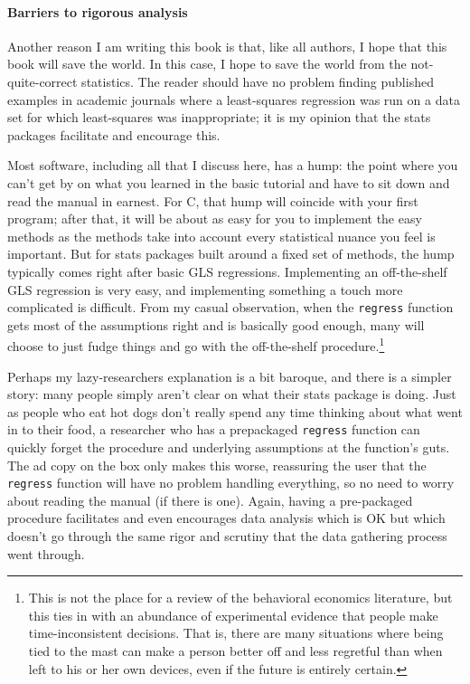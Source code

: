 \paragraph{Barriers to rigorous analysis}
Another reason I am writing this book is that, like all authors, I hope
that this book will save the world. In this case, I hope to save the
world from the not-quite-correct statistics.  The reader should have
no problem finding published examples in academic journals where a
least-squares regression was run on a data set for which least-squares
was inappropriate; it is my opinion that the stats packages facilitate
and encourage this.

Most software, including all that I discuss here, has a hump: the
point where you can't get by on what you learned in the basic tutorial
and have to sit down and read the manual in earnest. For C, that hump
will coincide with your first program; after that, it will be about as
easy for you to implement the easy methods as the methods take into account
every statistical nuance you feel is important. But for stats packages
built around a fixed set of methods, the hump typically comes right after
basic GLS regressions. Implementing an off-the-shelf GLS regression
is very easy, and implementing something a touch more complicated
is difficult.  From my casual observation,
when the {\tt regress} function gets most of the assumptions right and
is basically good enough, many will choose to just fudge things and
go with the off-the-shelf procedure.\footnote{This is not the place for
a review of the behavioral economics literature, but this ties in with an abundance of experimental
evidence that people make time-inconsistent decisions. That is, there
are many situations where being tied to the mast can make a person
better off and less regretful than when left to his or her own devices,
even if the future is entirely certain.}

Perhaps my lazy-researchers explanation is a bit baroque, and there is
a simpler story: many people simply aren't clear on what their stats package is doing.
Just as people who eat hot dogs don't really spend any
time thinking about what went in to their food, a researcher who has
a prepackaged {\tt regress} function can quickly forget the procedure
and underlying assumptions at the function's guts.  The ad copy on the
box only makes this worse, reassuring the user that the {\tt regress}
function will have no problem handling everything, so no need to worry
about reading the manual (if there is one). Again, having a pre-packaged
procedure facilitates and even encourages data analysis which is OK
but which doesn't go through the same rigor and scrutiny that the data gathering
process went through.

